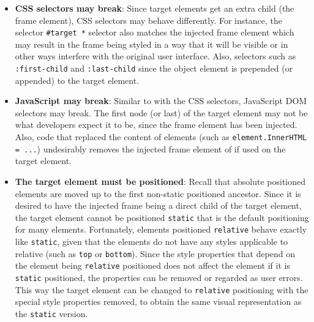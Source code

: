 \documentclass[a4paper,11pt]{kth-mag}
\newcommand{\code}[1]{\texttt{#1}}
\begin{document}
          \begin{itemize}
            \item \textbf{\gls{CSS} selectors may break}:
              Since target \glspl{element} get an extra child (the frame element), \gls{CSS} selectors may behave differently.
              For instance, the selector \code{\#target *} selector also matches the injected frame \gls{element} which may result in the frame being styled in a way that it will be visible or in other ways interfere with the original user interface.
              Also, selectors such as \code{:first-child} and \code{:last-child} since the object \gls{element} is prepended (or appended) to the target \gls{element}.
            \item \textbf{\gls{JavaScript} may break}:
              Similar to with the \gls{CSS} selectors, \gls{JavaScript} \gls{DOM} selectors may break.
              The first node (or last) of the target \gls{element} may not be what developers expect it to be, since the frame \gls{element} has been injected.
              Also, code that replaced the content of \glspl{element} (such as \code{element.InnerHTML = ...}) undesirably removes the injected frame \gls{element} of if used on the target \gls{element}.
            \item \textbf{The target \gls{element} must be positioned}:
              Recall that absolute positioned \glspl{element} are moved up to the first non-static positioned ancestor.
              Since it is desired to have the injected frame being a direct child of the target \gls{element}, the target \gls{element} cannot be positioned \code{static} that is the default positioning for many \glspl{element}.
              Fortunately, \glspl{element} positioned \code{relative} behave exactly like \code{static}, given that the \glspl{element} do not have any styles applicable to relative (such as \code{top} or \code{bottom}).
              Since the style properties that depend on the \gls{element} being \code{relative} positioned does not affect the \gls{element} if it is \code{static} positioned, the properties can be removed or regarded as user errors.
              This way the target \gls{element} can be changed to \code{relative} positioning with the special style properties removed, to obtain the same visual representation as the \code{static} version.
          \end{itemize}

\end{document}
